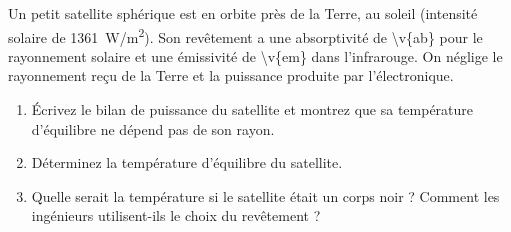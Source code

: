 Un petit satellite sphérique est en orbite près de la Terre, au soleil (intensité solaire de \qty{1361}{W/m^2}). Son revêtement a une absorptivité de \num{\v{ab}} pour le rayonnement solaire et une émissivité de \num{\v{em}} dans l'infrarouge. On néglige le rayonnement reçu de la Terre et la puissance produite par l'électronique.

\begin{enumerate}[label=\alph*)]
    \item Écrivez le bilan de puissance du satellite et montrez que sa température d'équilibre ne dépend pas de son rayon.
    \item Déterminez la température d'équilibre du satellite.
    \item Quelle serait la température si le satellite était un corps noir ? Comment les ingénieurs utilisent-ils le choix du revêtement ?
\end{enumerate}
